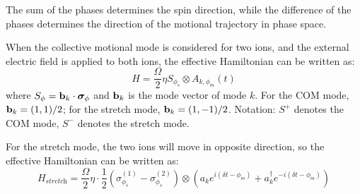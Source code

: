 \documentclass{notes2}
\begin{document}
The sum of the phases determines the spin direction, while the difference of the phases determines the direction of the motional trajectory in phase space.

When the collective motional mode is considered for two ions, and the external electric field is applied to both ions, the effective Hamiltonian can be written as:
\begin{equation}
    H = \frac{\Omega}{2} \eta S_{\phi_s} \otimes A_{k, \phi_m}(t) \tag{Effective Hamiltonian for bichromatic laser coupling with two ions}
\end{equation}
where $S_\phi = \vb b_k \cdot \vb*\sigma_\phi$ and $\vb b_k$ is the mode vector of mode $k$. For the COM mode, $\vb b_k = (1,1)/2$; for the stretch mode, $\vb b_k = (1,-1)/2$. Notation: $S^+$ denotes the COM mode, $S^-$ denotes the stretch mode.

For the stretch mode, the two ions will move in opposite direction, so the effective Hamiltonian can be written as:
\begin{equation}
    H_{\textit{stretch}} = \frac{\Omega}{2} \eta \cdot \frac{1}{2}(\sigma_{\phi_s}^{(1)} - \sigma_{\phi_s}^{(2)}) \otimes (a_k e^{i(\delta t - \phi_m)} + a_k^\dagger e^{-i(\delta t - \phi_m)})
\end{equation}
\end{document}
